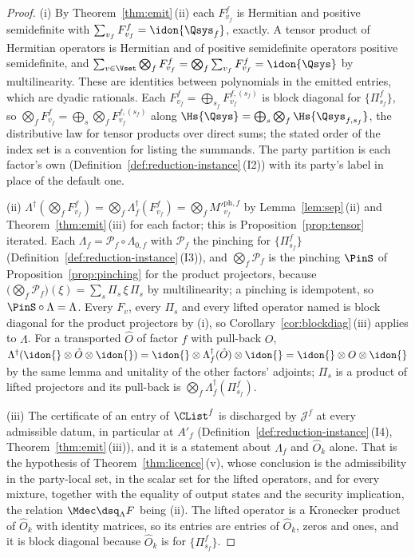 \begin{proof}
(i) By Theorem~\ref{thm:emit}\,(ii) each $F^{f}_{v_f}$ is Hermitian and
positive semidefinite with $\sum_{v_f}F^{f}_{v_f}=\idon{\Qsys_f}$, exactly.
A tensor product of Hermitian operators is Hermitian and of positive
semidefinite operators positive semidefinite, and
$\sum_{v\in\Vset}\bigotimes_fF^{f}_{v_f}
=\bigotimes_f\sum_{v_f}F^{f}_{v_f}=\idon{\Qsys}$ by multilinearity. These
are identities between polynomials in the emitted entries, which are dyadic
rationals. Each $F^{f}_{v_f}=\bigoplus_{s_f}F^{f,(s_f)}_{v_f}$ is block
diagonal for $\{\Pi^{f}_{s_f}\}$, so
$\bigotimes_fF^{f}_{v_f}=\bigoplus_{s}\bigotimes_fF^{f,(s_f)}_{v_f}$ along
$\Hs{\Qsys}=\bigoplus_s\bigotimes_f\Hs{\Qsys_{f,s_f}}$, the distributive law
for tensor products over direct sums; the stated order of the index set is a
convention for listing the summands. The party partition is each factor's
own (Definition~\ref{def:reduction-instance}\,(I2)) with its party's label
in place of the default one.

(ii) $\Lambda^{\dagger}(\bigotimes_fF^{f}_{v_f})
=\bigotimes_f\Lambda_f^{\dagger}(F^{f}_{v_f})=\bigotimes_f{M'}^{\mathrm{ph},f}_{v_f}$ by
Lemma~\ref{lem:sep}\,(ii) and Theorem~\ref{thm:emit}\,(iii) for each factor;
this is Proposition~\ref{prop:tensor} iterated. Each
$\Lambda_f=\mathcal{P}_f\circ\Lambda_{0,f}$ with $\mathcal{P}_f$ the
pinching for $\{\Pi^{f}_{s_f}\}$
(Definition~\ref{def:reduction-instance}\,(I3)), and
$\bigotimes_f\mathcal{P}_f$ is the pinching $\PinS$ of
Proposition~\ref{prop:pinching} for the product projectors, because
$\big(\bigotimes_f\mathcal{P}_f\big)(\xi)=\sum_{s}\Pi_s\,\xi\,\Pi_s$ by
multilinearity; a pinching is idempotent, so $\PinS\circ\Lambda=\Lambda$.
Every $F_v$, every $\Pi_s$ and every lifted operator named is block
diagonal for the product projectors by (i), so
Corollary~\ref{cor:blockdiag}\,(iii) applies to $\Lambda$. For a transported
$\hat O$ of factor $f$ with pull-back $O$,
$\Lambda^{\dagger}(\idon{}\otimes\hat O\otimes\idon{})
=\idon{}\otimes\Lambda_f^{\dagger}(\hat O)\otimes\idon{}
=\idon{}\otimes O\otimes\idon{}$ by the same lemma and unitality of the
other factors' adjoints; $\Pi_s$ is a product of lifted projectors and its
pull-back is $\bigotimes_f\Lambda_f^{\dagger}(\Pi^{f}_{s_f})$.

(iii) The certificate of an entry of $\CList^{f}$ is discharged by
$\mathcal{J}^{f}$ at every admissible datum, in particular at $A'_f$
(Definition~\ref{def:reduction-instance}\,(I4), Theorem~\ref{thm:emit}\,(iii)),
and it is a statement about $\Lambda_f$ and $\hat O_k$ alone. That is the
hypothesis of Theorem~\ref{thm:licence}\,(v), whose conclusion is the
admissibility in the party-local set, in the scalar set for the lifted
operators, and for every mixture, together with the equality of output
states and the security implication, the relation $\Mdec\dsq_{\Lambda}F$
being (ii). The lifted operator is a Kronecker product of $\hat O_k$ with
identity matrices, so its entries are entries of $\hat O_k$, zeros and ones,
and it is block diagonal because $\hat O_k$ is for $\{\Pi^{f}_{s_f}\}$.


\end{proof}
